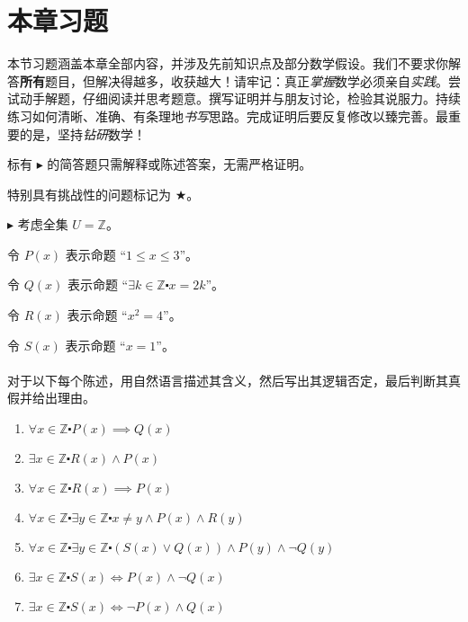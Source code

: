 \section{本章习题}

本节习题涵盖本章全部内容，并涉及先前知识点及部分数学假设。我们不要求你解答\textbf{所有}题目，但解决得越多，收获越大！请牢记：真正\emph{掌握}数学必须亲自\emph{实践}。尝试动手解题，仔细阅读并思考题意。撰写证明并与朋友讨论，检验其说服力。持续练习如何清晰、准确、有条理地\emph{书写}思路。完成证明后要反复修改以臻完善。最重要的是，坚持\emph{钻研}数学！

标有 $\blacktriangleright$ 的简答题只需解释或陈述答案，无需严格证明。

特别具有挑战性的问题标记为 $\bigstar$。

\begin{exercise}
    $\blacktriangleright$ 考虑全集 $U=\mathbb{Z}$。

    令 $P(x)$ 表示命题 ``$1 \le x \le 3$''。

    令 $Q(x)$ 表示命题 ``$\exists k \in \mathbb{Z} \centerdot x=2k$''。

    令 $R(x)$ 表示命题 ``$x^2=4$''。

    令 $S(x)$ 表示命题 ``$x=1$''。\\
    \\
    对于以下每个陈述，用自然语言描述其含义，然后写出其逻辑否定，最后判断其真假并给出理由。

    \begin{enumerate}[label=(\alph*)]
        \item $\forall x \in \mathbb{Z} \centerdot P(x) \implies Q(x)$
        \item $\exists x \in \mathbb{Z} \centerdot R(x) \land P(x)$
        \item $\forall x \in \mathbb{Z} \centerdot R(x) \implies P(x)$
        \item $\forall x \in \mathbb{Z} \centerdot \exists y \in \mathbb{Z} \centerdot x \ne y \land P(x) \land R(y)$
        \item $\forall x \in \mathbb{Z} \centerdot \exists y \in \mathbb{Z} \centerdot (S(x) \lor Q(x)) \land P(y) \land \neg Q(y)$
        \item $\exists x \in \mathbb{Z} \centerdot S(x) \iff P(x) \land \neg Q(x)$
        \item $\exists x \in \mathbb{Z} \centerdot S(x) \iff \neg P(x) \land Q(x)$
    \end{enumerate}
\end{exercise}

